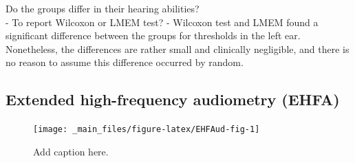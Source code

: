 \documentclass[a4paper, twoside]{templates/ociamthesis}
\begin{document}
\colorbox[HTML]{CCCCFF}{Do the groups differ in their hearing abilities?}\\
- To report Wilcoxon or LMEM test? - Wilcoxon test and LMEM found a significant difference between the groups for thresholds in the left ear. Nonetheless, the differences are rather small and clinically negligible, and there is no reason to assume this difference occurred by random.

\hypertarget{extended-high-frequency-audiometry-ehfa-1}{%
\subsection{Extended high-frequency audiometry (EHFA)}\label{extended-high-frequency-audiometry-ehfa-1}}

\begin{figure}

{\centering \texttt{[image: \_main\_files/figure-latex/EHFAud-fig-1]} 

}

\caption{Add caption here.}\label{fig:EHFAud-fig}
\end{figure}
\end{document}
